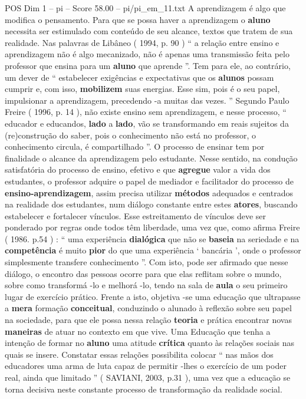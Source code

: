 \begin{textsample}{POS Dim 1 – pi – Score 58.00 – pi/pi\_em\_11.txt}
A aprendizagem é algo que modifica o pensamento.
Para que se possa haver a aprendizagem o \textbf{aluno} necessita ser estimulado com conteúdo de seu alcance, textos que tratem de sua realidade.
Nas palavras de Libâneo ( 1994, p. 90 ) “ a relação entre ensino e aprendizagem não é algo mecanizado, não é apenas uma transmissão feita pelo professor que ensina para um \textbf{aluno} que aprende ”.
Tem para ele, ao contrário, um dever de “ estabelecer exigências e expectativas que os \textbf{alunos} possam cumprir e, com isso, \textbf{mobilizem} suas energias.
Esse sim, pois é o seu papel, impulsionar a aprendizagem, precedendo -a muitas das vezes. ” Segundo Paulo Freire ( 1996, p. 14 ), não existe ensino sem aprendizagem, e nesse processo, “ educador e educandos, \textbf{lado} a \textbf{lado}, vão se transformando em reais sujeitos da (re)construção do saber, pois o conhecimento não está no professor, o conhecimento circula, é compartilhado ”.
O processo de ensinar tem por finalidade o alcance da aprendizagem pelo estudante.
Nesse sentido, na condução satisfatória do processo de ensino, efetivo e que \textbf{agregue} valor a vida dos estudantes, o professor adquire o papel de mediador e facilitador do processo de \textbf{ensino-aprendizagem}, assim precisa utilizar \textbf{métodos} adequados e centrados na realidade dos estudantes, num diálogo constante entre estes \textbf{atores}, buscando estabelecer e fortalecer vínculos.
Esse estreitamento de vínculos deve ser ponderado por regras onde todos têm liberdade, uma vez que, como afirma Freire ( 1986. p.54 ) : “ uma experiência \textbf{dialógica} que não se \textbf{baseia} na seriedade e na \textbf{competência} é muito \textbf{pior} do que uma experiência ‘ bancária ’, onde o professor simplesmente transfere conhecimento ”.
Com isto, pode ser afirmado que nesse diálogo, o encontro das pessoas ocorre para que elas reflitam sobre o mundo, sobre como transformá -lo e melhorá -lo, tendo na sala de \textbf{aula} o seu primeiro lugar de exercício prático.
Frente a isto, objetiva -se uma educação que ultrapasse a \textbf{mera} formação \textbf{conceitual}, conduzindo o alunado à reflexão sobre seu papel na sociedade, para que ele possa nessa relação \textbf{teoria} e prática encontrar novas \textbf{maneiras} de atuar no contexto em que vive.
Uma Educação que tenha a intenção de formar no \textbf{aluno} uma atitude \textbf{crítica} quanto às relações sociais nas quais se insere.
Constatar essas relações possibilita colocar “ nas mãos dos educadores uma arma de luta capaz de permitir -lhes o exercício de um poder real, ainda que limitado ” ( SAVIANI, 2003, p.31 ), uma vez que a educação se torna decisiva neste constante processo de transformação da realidade social.

\end{textsample}
